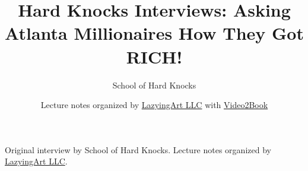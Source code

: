 \documentclass[11pt,oneside]{book}
\begin{document}
\frontmatter
\title{Hard Knocks Interviews: Asking Atlanta Millionaires How They Got RICH!}
\author{School of Hard Knocks}
\date{Lecture notes organized by \href{https://lazying.art}{LazyingArt LLC} with \href{https://github.com/lachlanchen/Video2Book}{Video2Book}}
\maketitle
\begin{center}
\small Original interview by School of Hard Knocks. Lecture notes organized by \href{https://lazying.art}{LazyingArt LLC}.
\end{center}
\clearpage
\mainmatter

\end{document}
